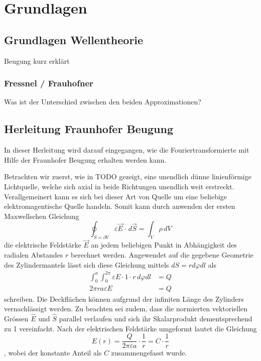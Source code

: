 %
%
%
%
\section{Grundlagen\label{opt:section:grundlagen}}

\subsection{Grundlagen Wellentheorie}
Beugung kurz erklärt

\subsubsection{Fressnel / Frauhofner}
Was ist der Unterschied zwischen den beiden Approximationen?

\subsection{Herleitung Fraunhofer Beugung}
In dieser Herleitung wird darauf eingegangen, wie die Fouriertransformierte mit Hilfe der Fraunhofer Beugung erhalten werden kann.

Betrachten wir zuerst, wie in TODO gezeigt, eine unendlich dünne linienförmige Lichtquelle, welche sich axial in beide Richtungen unendlich weit erstreckt.
Verallgemeinert kann es sich bei dieser Art von Quelle um eine beliebige elektromagentische Quelle handeln.
Somit kann durch anwenden der ersten Maxwellschen Gleichung
\begin{equation}
\oint_{S=\partial V} \varepsilon\vec{E} \cdot\, d\vec{S}
=
\int_{V}\rho\, dV
\end{equation}
die elektrische Feldstärke $\vec{E}$ an jedem beliebigen Punkt in Abhängigkeit des radialen Abstandes $r$ berechnet werden.
Angewendet auf die gegebene Geometrie des Zylindermantels lässt sich diese Gleichung mittels $dS = r d\varphi dl$ als
\begin{align}
\int_{0}^{a}\int_{0}^{2\pi} \varepsilon E\cdot 1 \cdot r\, d\varphi dl
&=
Q
\\
2\pi ra\varepsilon E
&=
Q
\end{align}
schreiben.
Die Deckflächen können aufgrund der infiniten Länge des Zylinders vernachlässigt werden.
Zu beachten sei zudem, dass die normierten vektoriellen Grössen $\hat{E}$ und $\hat{S}$ parallel verlaufen und sich ihr Skalarprodukt dementsprechend zu 1 vereinfacht.
Nach der elektrischen Feldstärke umgeformt lautet die Gleichung
\begin{equation}
E(r)
=
\frac{Q}{2\pi\varepsilon a} \cdot \frac{1}{r}
=
C \cdot \frac{1}{r}
\label{opt:equation:E}
\end{equation}
, wobei der konstante Anteil als $C$ zusammengefasst wurde.

